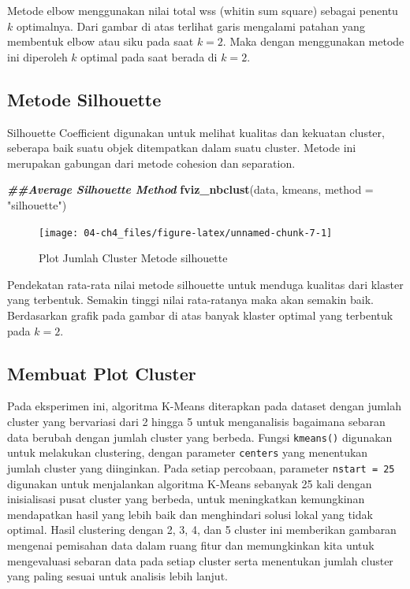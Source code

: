 \documentclass[
  oneside]{book}
\newenvironment{Shaded}{\begin{snugshade}}{\end{snugshade}}
\newcommand{\AttributeTok}[1]{\textcolor[rgb]{0.13,0.29,0.53}{#1}}
\newcommand{\DocumentationTok}[1]{\textcolor[rgb]{0.56,0.35,0.01}{\textbf{\textit{#1}}}}
\newcommand{\FunctionTok}[1]{\textcolor[rgb]{0.13,0.29,0.53}{\textbf{#1}}}
\newcommand{\NormalTok}[1]{#1}
\newcommand{\StringTok}[1]{\textcolor[rgb]{0.31,0.60,0.02}{#1}}
\begin{document}
Metode elbow menggunakan nilai total wss (whitin sum square) sebagai penentu \(k\) optimalnya. Dari gambar di atas terlihat garis mengalami patahan yang membentuk elbow atau siku pada saat \(k=2\). Maka dengan menggunakan metode ini diperoleh \(k\) optimal pada saat berada di \(k=2\).

\subsection*{Metode Silhouette}\label{metode-silhouette}

Silhouette Coefficient digunakan untuk melihat kualitas dan kekuatan cluster, seberapa baik suatu objek ditempatkan dalam suatu cluster. Metode ini merupakan gabungan dari metode cohesion dan separation.

\begin{Shaded}
\begin{Highlighting}[]
\DocumentationTok{\#\#Average Silhouette Method}
\FunctionTok{fviz\_nbclust}\NormalTok{(data, kmeans, }\AttributeTok{method =} \StringTok{"silhouette"}\NormalTok{)}
\end{Highlighting}
\end{Shaded}

\begin{figure}[h]

{\centering \texttt{[image: 04-ch4\_files/figure-latex/unnamed-chunk-7-1]} 

}

\caption{Plot Jumlah Cluster Metode silhouette}\label{fig:unnamed-chunk-7}
\end{figure}

Pendekatan rata-rata nilai metode silhouette untuk menduga kualitas dari klaster yang terbentuk. Semakin tinggi nilai rata-ratanya maka akan semakin baik. Berdasarkan grafik pada gambar di atas banyak klaster optimal yang terbentuk pada \(k=2\).

\subsection*{Membuat Plot Cluster}\label{membuat-plot-cluster}

Pada eksperimen ini, algoritma K-Means diterapkan pada dataset dengan jumlah cluster yang bervariasi dari 2 hingga 5 untuk menganalisis bagaimana sebaran data berubah dengan jumlah cluster yang berbeda. Fungsi \texttt{kmeans()} digunakan untuk melakukan clustering, dengan parameter \texttt{centers} yang menentukan jumlah cluster yang diinginkan. Pada setiap percobaan, parameter \texttt{nstart\ =\ 25} digunakan untuk menjalankan algoritma K-Means sebanyak 25 kali dengan inisialisasi pusat cluster yang berbeda, untuk meningkatkan kemungkinan mendapatkan hasil yang lebih baik dan menghindari solusi lokal yang tidak optimal. Hasil clustering dengan 2, 3, 4, dan 5 cluster ini memberikan gambaran mengenai pemisahan data dalam ruang fitur dan memungkinkan kita untuk mengevaluasi sebaran data pada setiap cluster serta menentukan jumlah cluster yang paling sesuai untuk analisis lebih lanjut.
\end{document}
